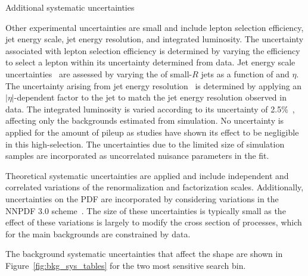 \begin{section}{Additional systematic uncertainties}

Other experimental uncertainties are small and include lepton selection efficiency, jet energy scale, jet energy resolution, and integrated luminosity.
The uncertainty associated with lepton selection efficiency is determined by varying the efficiency to select a lepton within its uncertainty determined from data.
Jet energy scale uncertainties~\cite{Chatrchyan:2011ds,1748-0221-12-02-P02014} are assessed by varying the \pT of small-$R$ jets as a function of \pT and $\eta$.
The uncertainty arising from jet energy resolution~\cite{Chatrchyan:2011ds,1748-0221-12-02-P02014} is determined by applying an $|\eta|$-dependent factor to the jet \pT to match the jet energy resolution observed in data.
The integrated luminosity is varied according to its uncertainty of 2.5\%~\cite{CMS-PAS-LUM-17-001}, affecting only the backgrounds estimated from simulation.
No uncertainty is applied for the amount of pileup as studies have shown its effect to be negligible in this high-\HT selection.
The uncertainties due to the limited size of simulation samples are incorporated as uncorrelated nuisance parameters in the fit.

Theoretical systematic uncertainties are applied and include independent and correlated variations of the renormalization  and factorization scales.
Additionally, uncertainties on the PDF are incorporated by considering variations in the NNPDF 3.0 scheme~\cite{Ball:2014uwa}.
The size of these uncertainties is typically small as the effect of these variations is largely to modify the cross section of processes, which for the main backgrounds are constrained by data.

The background systematic uncertainties that affect the \Nb shape are shown in Figure~\ref{fig:bkg_sys_tables} for the two most sensitive search bin.


\end{section}
